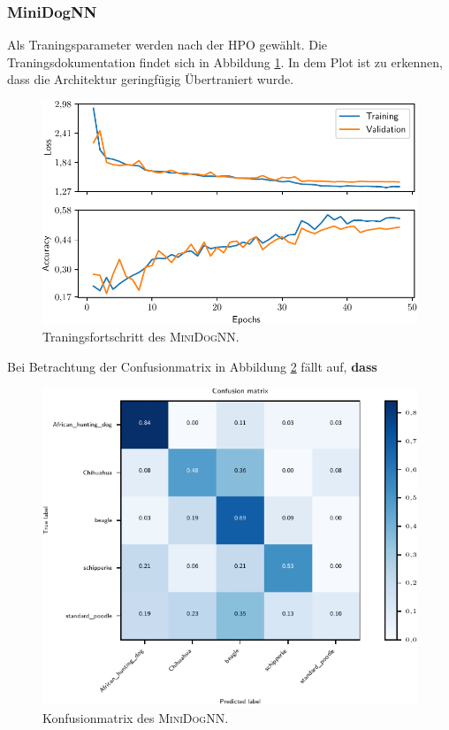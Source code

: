 \subsubsection{MiniDogNN}
Als Traningsparameter werden nach der HPO gewählt.
Die Traningsdokumentation findet sich in Abbildung \ref{fig:MiniDogNN_Loss_Acc}.
In dem Plot ist zu erkennen, dass die Architektur geringfügig Übertraniert
wurde.
\begin{figure}
\centering
\includegraphics[width=\the\textwidth, scale=0.6]{../../final_data/MiniNN_n5/history.pdf}
\caption{Traningsfortschritt des \textsc{MiniDogNN}.}
\label{fig:MiniDogNN_Loss_Acc}
\end{figure}
Bei Betrachtung der Confusionmatrix in Abbildung \ref{fig:MiniDogNN_Konfusionmatrix} fällt auf, \textbf{dass}
\begin{figure}
\centering
\includegraphics[width=\the\textwidth, scale=0.6]{../../final_data/MiniNN_n5/confusion_matrix_mini.pdf}
\caption{Konfusionmatrix des \textsc{MiniDogNN}.}
\label{fig:MiniDogNN_Konfusionmatrix}
\end{figure}
